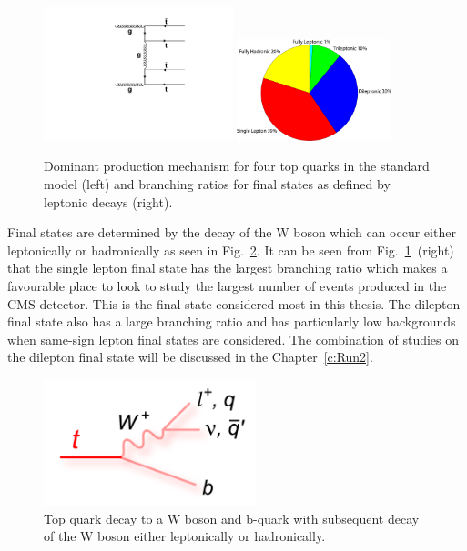 \begin{figure}[ht!]
\begin{center}
    \includegraphics[width=0.49\textwidth]{images/Theory/tttt_t_LO.pdf}
    \includegraphics[width=0.4\textwidth]{images/Theory/FourTopBR.pdf}
    \caption{Dominant production mechanism for four top quarks in the standard model (left) and branching ratios for final states as defined by leptonic decays (right).}
    \label{fig:ttttAtLO}
\end{center}
\end{figure}

Final states are determined by the decay of the W boson which can occur either leptonically or hadronically as seen in Fig.~\ref{fig:topdecay}. It can be seen from Fig.~\ref{fig:ttttAtLO}~(right) that the single lepton final state has the largest branching ratio which makes a favourable place to look to study the largest number of events produced in the CMS detector. This is the final state considered most in this thesis. The dilepton final state also has a large branching ratio and has particularly low backgrounds when same-sign lepton final states are considered. The combination of studies on the dilepton final state will be discussed in the Chapter~\ref{c:Run2}.

\begin{figure}[ht!]
\begin{center}
    \includegraphics[width=0.55\textwidth]{images/Theory/topdecay.png}
    \caption{Top quark decay to a W boson and b-quark with subsequent decay of the W boson either leptonically or hadronically.}
    \label{fig:topdecay}
\end{center}
\end{figure}


